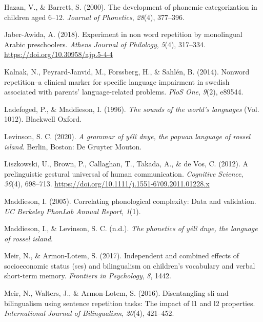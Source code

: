 \documentclass[english,,man,floatsintext]{apa6}
\begin{document}
\leavevmode\hypertarget{ref-hazan2000development}{}%
Hazan, V., \& Barrett, S. (2000). The development of phonemic categorization in children aged 6--12. \emph{Journal of Phonetics}, \emph{28}(4), 377--396.

\leavevmode\hypertarget{ref-jabere2018xperiment}{}%
Jaber-Awida, A. (2018). Experiment in non word repetition by monolingual Arabic preschoolers. \emph{Athens Journal of Philology}, \emph{5}(4), 317--334. \url{https://doi.org/10.30958/ajp.5-4-4}

\leavevmode\hypertarget{ref-kalnak2014nonword}{}%
Kalnak, N., Peyrard-Janvid, M., Forssberg, H., \& Sahlén, B. (2014). Nonword repetition--a clinical marker for specific language impairment in swedish associated with parents' language-related problems. \emph{PloS One}, \emph{9}(2), e89544.

\leavevmode\hypertarget{ref-ladefoged1996sounds}{}%
Ladefoged, P., \& Maddieson, I. (1996). \emph{The sounds of the world's languages} (Vol. 1012). Blackwell Oxford.

\leavevmode\hypertarget{ref-levinsonYDgrammar}{}%
Levinson, S. C. (2020). \emph{A grammar of yélî dnye, the papuan language of rossel island}. Berlin, Boston: De Gruyter Mouton.

\leavevmode\hypertarget{ref-liszkowski2012prelinguistic}{}%
Liszkowski, U., Brown, P., Callaghan, T., Takada, A., \& de Vos, C. (2012). A prelinguistic gestural universal of human communication. \emph{Cognitive Science}, \emph{36}(4), 698--713. \url{https://doi.org/10.1111/j.1551-6709.2011.01228.x}

\leavevmode\hypertarget{ref-maddieson2005correlating}{}%
Maddieson, I. (2005). Correlating phonological complexity: Data and validation. \emph{UC Berkeley PhonLab Annual Report}, \emph{1}(1).

\leavevmode\hypertarget{ref-maddiesonIPphoneticsYD}{}%
Maddieson, I., \& Levinson, S. C. (n.d.). \emph{The phonetics of yélî dnye, the language of rossel island}.

\leavevmode\hypertarget{ref-meir2017independent}{}%
Meir, N., \& Armon-Lotem, S. (2017). Independent and combined effects of socioeconomic status (ses) and bilingualism on children's vocabulary and verbal short-term memory. \emph{Frontiers in Psychology}, \emph{8}, 1442.

\leavevmode\hypertarget{ref-meir2016disentangling}{}%
Meir, N., Walters, J., \& Armon-Lotem, S. (2016). Disentangling sli and bilingualism using sentence repetition tasks: The impact of l1 and l2 properties. \emph{International Journal of Bilingualism}, \emph{20}(4), 421--452.
\end{document}
